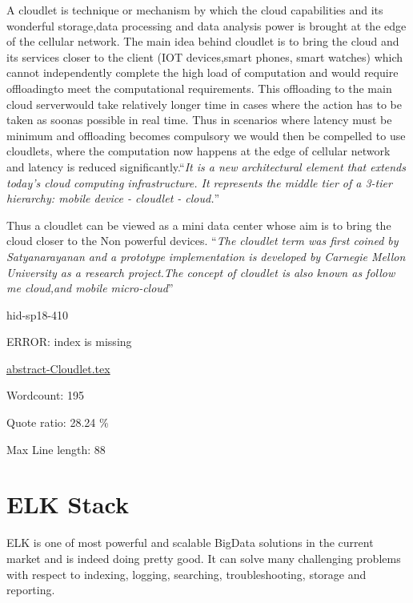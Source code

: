 A cloudlet is technique or mechanism by which the cloud capabilities
and its wonderful storage,data processing and data analysis power is
brought at the edge of the cellular network.  The main idea behind
cloudlet is to bring the cloud and its services closer to the
client (IOT devices,smart phones, smart watches) which cannot
independently complete the high load of computation and would require
offloadingto meet the computational requirements. This offloading to
the main cloud serverwould take relatively longer time in cases where
the action has to be taken as soonas possible in real time. Thus in
scenarios where latency must be minimum and offloading becomes
compulsory we would then be compelled to use cloudlets, where the
computation now happens at the edge of cellular network and latency is
reduced significantly.\color{blue}``\emph{It is a new architectural element that extends
today's cloud computing infrastructure.  It represents the middle tier
of a 3-tier hierarchy: mobile device - cloudlet -
cloud.}''\color{black}~\cite{hid-sp18-410-wikiCloudlet}

Thus a cloudlet can be viewed as a mini data center whose aim is to
bring the cloud closer to the Non powerful devices. \color{blue}``\emph{The cloudlet
term was first coined by Satyanarayanan and a prototype implementation
is developed by Carnegie Mellon University as a research project.The
concept of cloudlet is also known as follow me cloud,and mobile
micro-cloud}''\color{black}~\cite{hid-sp18-410-wikiCloudlet}


\begin{IU}

hid-sp18-410

ERROR: index is missing

\href{https://github.com/cloudmesh-community/hid-sp18-410/blob/master//technology/abstract-Cloudlet.tex}{abstract-Cloudlet.tex}

 

Wordcount: 195


Quote ratio: 28.24 \%
 
Max Line length: 88
\end{IU}

\section{ELK Stack}

ELK is one of most powerful and scalable BigData solutions in the current
market and is indeed doing pretty good. It can solve many challenging 
problems with respect to indexing, logging, searching, troubleshooting,
storage and reporting.

